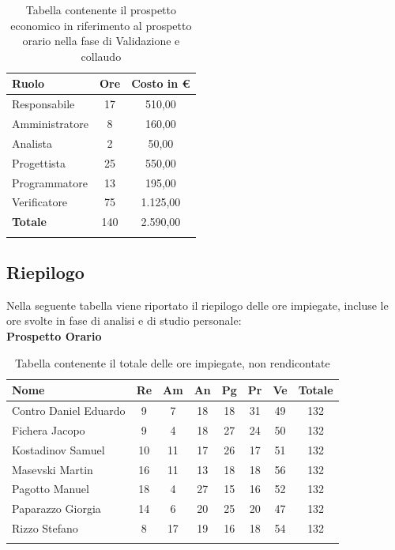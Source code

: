 \documentclass[../piano_di_progetto.tex]{subfiles}
\begin{document}
\begin{center}
	\begin{longtable}{|l|c|c|}
		\hline
		\rowcolor{lightgray}
		\textbf{Ruolo} & \textbf{Ore} & \textbf{Costo in €}\\

		\hline
		Responsabile & 17 & 510,00\\
		Amministratore & 8 & 160,00\\
		Analista & 2 & 50,00\\
		Progettista & 25 & 550,00\\
		Programmatore & 13 & 195,00\\
		Verificatore & 75 & 1.125,00\\
		\hline
		\textbf{Totale} & 140 & 2.590,00\\
		\hline
		\rowcolor{white}
		\caption{Tabella contenente il prospetto economico in riferimento al prospetto orario nella fase di Validazione e collaudo}
	\end{longtable}
\end{center}

\newpage

\subsection{Riepilogo}%
\label{sub:riepilog}
Nella seguente tabella viene riportato il riepilogo delle ore impiegate, incluse le ore svolte in fase di analisi e di studio personale: \\

\textbf{Prospetto Orario}

\begin{center}
	\begin{longtable}{|l|c|c|c|c|c|c|c|}
		\hline
		\rowcolor{lightgray}
		\textbf{Nome} & \textbf{Re} & \textbf{Am} & \textbf{An} & \textbf{Pg}  & \textbf{Pr}   & \textbf{Ve} & \textbf{Totale} \\

		\hline
			Contro Daniel Eduardo & 9 & 7 & 18 & 18 & 31 & 49 & 132 \\
			Fichera Jacopo & 9 & 4 & 18 & 27 & 24 & 50 & 132 \\
			Kostadinov Samuel & 10 & 11 & 17 & 26 & 17 & 51 & 132 \\
			Masevski Martin & 16 & 11 & 13 & 18 & 18 & 56 & 132 \\
			Pagotto Manuel & 18 & 4 & 27 & 15 & 16 & 52 & 132 \\			
			Paparazzo Giorgia & 14 & 6 & 20 & 25 & 20 & 47 & 132 \\
			Rizzo Stefano & 8 & 17 & 19 & 16 & 18 & 54 & 132 \\
		\hline	
		\rowcolor{white}
		\caption{Tabella contenente il totale delle ore impiegate, non rendicontate}
	\end{longtable}
\end{center}
\end{document}
